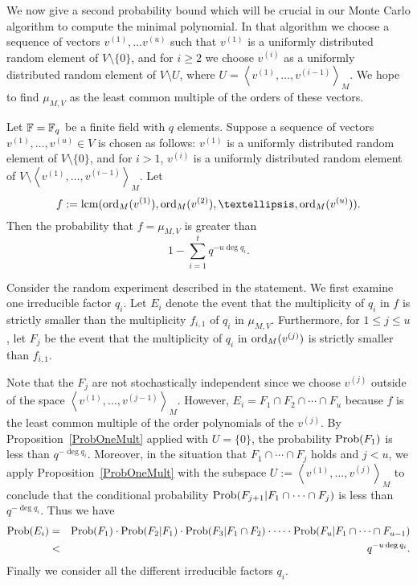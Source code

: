 \smallskip
We now give a second probability bound which will be crucial in our
Monte Carlo algorithm to compute the minimal polynomial. In 
that algorithm we choose  a sequence of vectors 
$v^{(1)}, \dots v^{(u)}$ such that $v^{(1)}$ is a uniformly distributed
random element of $V\setminus\{0\}$, and for $i\geq2$ we choose
$v^{(i)}$ as a uniformly distributed random element of 
$V \setminus U$, where $U=\left< v^{(1)}, \ldots, v^{(i-1)} \right>_M$.
We hope to find $\mu_{M,V}$ as the least common multiple of the
orders of these vectors.


\begin{Prop}
\label{ProbAllMult}
Let\/ $\mathbb{F} = \mathbb{F}_q$ be a finite field with $q$ elements.
Suppose a sequence of vectors $v^{(1)}, \ldots, v^{(u)} \in V$ is chosen
as follows: $v^{(1)}$ is a uniformly
distributed random element of $V\setminus\{0\}$, and for $i>1$,
$v^{(i)}$ is a  uniformly distributed random element of  
$V \setminus \left< v^{(1)}, \ldots, v^{(i-1)} \right>_M$. 
Let
\[ 
f := \lcm( \ord_M(v^{(1)}), \ord_M(v^{(2)}), \ldots, 
\ord_M(v^{(u)}) ). 
\]
Then the probability that  $f = \mu_{M,V}$  is greater than
\[ 1-\sum_{i=1}^t q^{-u\deg q_i}. \]
\end{Prop}
\proofbeg
Consider the random experiment described in the statement. We first
examine one irreducible factor $q_i$. Let $E_i$ denote the event
that the multiplicity of $q_i$ in $f$ is strictly smaller than 
the multiplicity $f_{i,1}$ of $q_i$ in $\mu_{M,V}$. Furthermore, for
$1 \le j \le u$, let $F_j$  be the event that the multiplicity of $q_i$ in
$\mathrm{ord}_M(v^{(j)})$ is strictly smaller than $f_{i,1}$. 

Note that
the $F_j$ are not stochastically independent since we choose
$v^{(j)}$ outside of the space $\left< v^{(1)}, \ldots, v^{(j-1)}\right>_M$.
However, $E_i = F_1 \cap F_2 \cap \cdots \cap F_u$ because $f$ is the
least common multiple of the order polynomials of the $v^{(j)}$.
By Proposition~\ref{ProbOneMult} applied with $U=\{0\}$, 
the probability $\mathrm{Prob}(F_1)$
is less than $q^{-\deg q_i}$. Moreover, in the situation that 
$F_1 \cap \cdots \cap F_j$ holds and $j<u$,
we apply Proposition~\ref{ProbOneMult} with the
subspace $U := \left< v^{(1)}, \ldots, v^{(j)} \right>_M$ to conclude
that the conditional probability $\mathrm{Prob}(F_{j+1} | F_1 \cap \cdots \cap F_j)$
is less than $q^{-\deg q_i}$.
Thus we have
\begin{eqnarray*}
\mathrm{Prob}(E_i) &=& \mathrm{Prob}(F_1)\cdot \mathrm{Prob}(F_2 | F_1) \cdot \mathrm{Prob}(F_3 | F_1 \cap F_2)
   \cdot \cdots \cdot \mathrm{Prob}(F_u | F_1 \cap \cdots \cap F_{u-1}) \\
   &<& q^{-u\deg q_i}.
\end{eqnarray*}
Finally we consider all the different irreducible factors $q_i$. 

